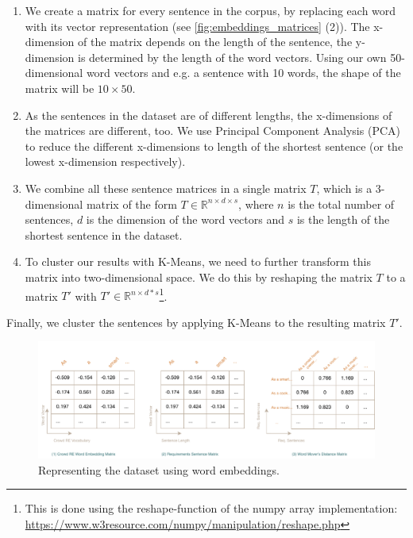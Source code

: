 \begin{enumerate}
\item We create a matrix for every sentence in the corpus, by replacing each word with its vector representation (see \autoref{fig:embeddings_matrices} (2)). The x-dimension of the matrix depends on the length of the sentence, the y-dimension is determined by the length of the word vectors. Using our own 50-dimensional word vectors and e.g. a sentence with 10 words, the shape of the matrix will be $10\times50$.
\item As the sentences in the dataset are of different lengths, the x-dimensions of the matrices are different, too. We use Principal Component Analysis (PCA)\,\cite{wold_principal_1987} to reduce the different x-dimensions to length of the shortest sentence (or the lowest x-dimension respectively).
\item We combine all these sentence matrices in a single matrix $T$, which is a 3-dimensional matrix of the form $T\in\mathbb{R}^{n \times d \times s}$, where $n$ is the total number of sentences, $d$ is the dimension of the word vectors and $s$ is the length of the shortest sentence in the dataset.
\item To cluster our results with K-Means, we need to further transform this matrix into two-dimensional space. We do this by reshaping the matrix $T$ to a matrix $T'$ with $T' \in \mathbb{R}^{n \times d * s}$\footnote{This is done using the reshape-function of the numpy array implementation: \url{https://www.w3resource.com/numpy/manipulation/reshape.php}}.
\end{enumerate}
Finally, we cluster the sentences by applying K-Means to the resulting matrix $T'$.

\begin{figure}[ht]
  \begin{center}
    \includegraphics[width=\textwidth]{figures/embedding_matrices.pdf}
    \caption{Representing the \crowdre{} dataset using word embeddings.}
    \label{fig:embeddings_matrices}
  \end{center}
\end{figure}